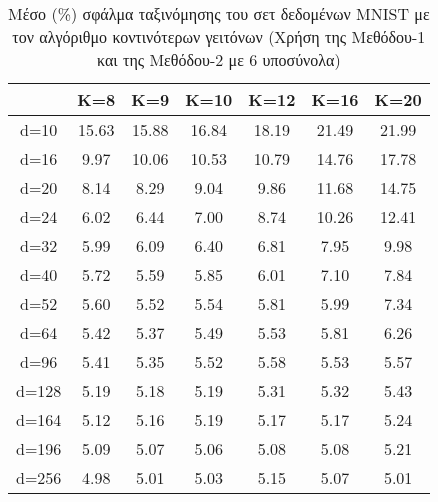\begin{table}[H]
\singlespacing
\centering
\label{tab:table8}
\caption{Μέσο (\%) σφάλμα ταξινόμησης του σετ δεδομένων \textlatin{MNIST} με τον αλγόριθμο κοντινότερων γειτόνων (Χρήση της Μεθόδου-1 και της Μεθόδου-2 με 6 υποσύνολα)}
\vspace*{5mm}
\begin{tabular}{|c|c|c|c|c|c|c|}
\hline
& K=8 & K=9 & K=10 & K=12 & K=16 & K=20 \\
\hline
d=10 & 15.63 & 15.88 & 16.84 & 18.19 & 21.49 & 21.99 \\
d=16 & 9.97 & 10.06 & 10.53 & 10.79 & 14.76 & 17.78 \\
d=20 & 8.14 & 8.29 & 9.04 & 9.86 & 11.68 & 14.75 \\
d=24 & 6.02 & 6.44 & 7.00 & 8.74 & 10.26 & 12.41 \\
d=32 & 5.99 & 6.09 & 6.40 & 6.81 & 7.95 & 9.98 \\
d=40 & 5.72 & 5.59 & 5.85 & 6.01 & 7.10 & 7.84 \\
d=52 & 5.60 & 5.52 & 5.54 & 5.81 & 5.99 & 7.34 \\
d=64 & 5.42 & 5.37 & 5.49 & 5.53 & 5.81 & 6.26 \\
d=96 & 5.41 & 5.35 & 5.52 & 5.58 & 5.53 & 5.57 \\
d=128 & 5.19 & 5.18 & 5.19 & 5.31 & 5.32 & 5.43 \\
d=164 & 5.12 & 5.16 & 5.19 & 5.17 & 5.17 & 5.24 \\
d=196 & 5.09 & 5.07 & 5.06 & 5.08 & 5.08 & 5.21 \\
d=256 & 4.98 & 5.01 & 5.03 & 5.15 & 5.07 & 5.01 \\
\hline
\end{tabular}
\end{table}

